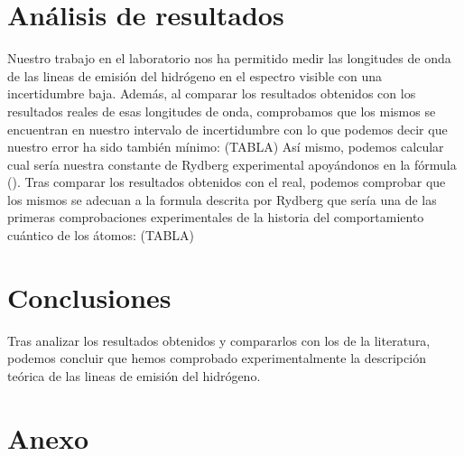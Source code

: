 \documentclass{article}
\begin{document}
\section{Análisis de resultados}
Nuestro trabajo en el laboratorio nos ha permitido medir las longitudes de onda de las lineas de emisión del hidrógeno en el espectro visible con una incertidumbre baja. Además, al comparar los resultados obtenidos con los resultados reales de esas longitudes de onda, comprobamos que los mismos se encuentran en nuestro intervalo de incertidumbre con lo que podemos decir que nuestro error ha sido también mínimo:
(TABLA)
Así mismo, podemos calcular cual sería nuestra constante de Rydberg experimental apoyándonos en la fórmula (). Tras comparar los resultados obtenidos con el real, podemos comprobar que los mismos se adecuan a la formula descrita por Rydberg que sería una de las primeras comprobaciones experimentales de la historia del comportamiento cuántico de los átomos:
(TABLA)
\section{Conclusiones}
Tras analizar los resultados obtenidos y compararlos con los de la literatura, podemos concluir que hemos comprobado experimentalmente la descripción teórica de las lineas de emisión del hidrógeno.



\section{Anexo}
\end{document}
